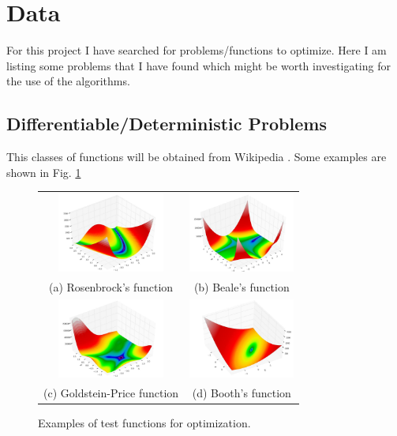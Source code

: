 \documentclass[conference]{IEEEtran}
\begin{document}
\section{Data}
For this project I have searched for problems/functions to optimize. Here I am listing some problems that I have found which might be worth investigating for the use of the algorithms.

\subsection{Differentiable/Deterministic Problems}
This classes of functions will be obtained from Wikipedia \cite{b3}. Some examples are shown in Fig. \ref{testfunfig}

\begin{figure}
\begin{tabular}{cc}
  \includegraphics[width=35mm]{Rosenbrock} &   \includegraphics[width=35mm]{Beale} \\
(a) Rosenbrock's function & (b) Beale's function \\[6pt]
 \includegraphics[width=35mm]{Goldstein_Price} &   \includegraphics[width=35mm]{Booth} \\
(c) Goldstein-Price function & (d) Booth's function \\[6pt]
\end{tabular}
\caption{Examples of test functions for optimization.}
\label{testfunfig}
\end{figure}
\end{document}
